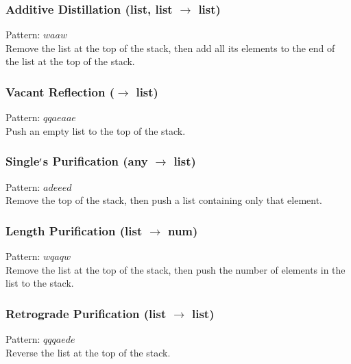 \documentclass[12pt]{article}
\begin{document}
  \label{sec: patterns/lists@hexcasting:add}
\subsubsection*{Additive Distillation (list, list $\rightarrow$ list)}

    Pattern: $waaw$\\
      Remove the list at the top of the stack, then add all its elements to the end of the list at the top of the stack.\\


  \label{sec: patterns/lists@hexcasting:empty_list}
\subsubsection*{Vacant Reflection ($\rightarrow$ list)}

    Pattern: $qqaeaae$\\
      Push an empty list to the top of the stack.\\


  \label{sec: patterns/lists@hexcasting:singleton}
\subsubsection*{Single$\rq$s Purification (any $\rightarrow$ list)}

    Pattern: $adeeed$\\
      Remove the top of the stack, then push a list containing only that element.\\


  \label{sec: patterns/lists@hexcasting:abs}
\subsubsection*{Length Purification (list $\rightarrow$ num)}

    Pattern: $wqaqw$\\
      Remove the list at the top of the stack, then push the number of elements in the list to the stack.\\


  \label{sec: patterns/lists@hexcasting:reverse}
\subsubsection*{Retrograde Purification (list $\rightarrow$ list)}

    Pattern: $qqqaede$\\
      Reverse the list at the top of the stack.\\
\end{document}
